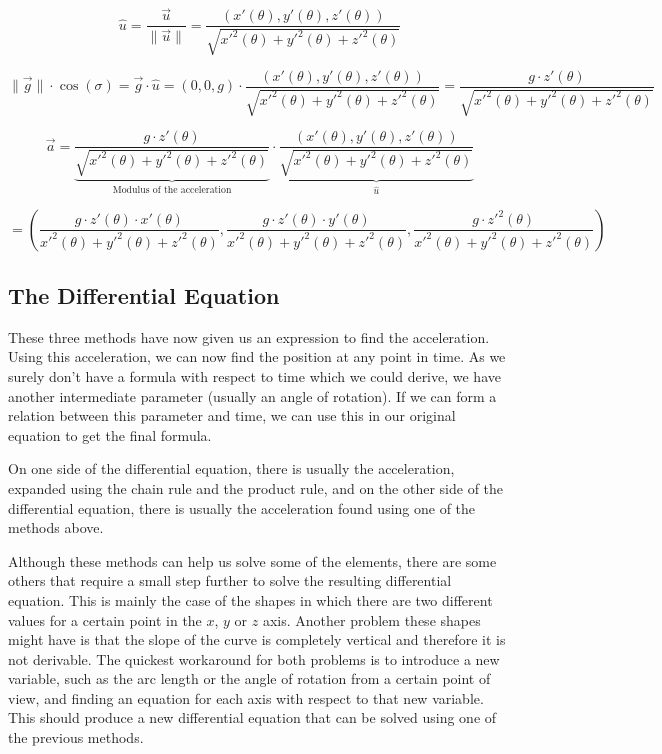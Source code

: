 \documentclass[12pt,twoside,a4paper]{article}
\begin{document}
	$$\hat{u} = \frac{\vec{u}}{\|\vec{u}\|} = \frac{(x'(\theta), y'(\theta), z'(\theta))}{\sqrt{x'^2(\theta) + y'^2(\theta) + z'^2(\theta)}}$$
	
	$$\|\vec{g}\| \cdot \cos(\sigma) = \vec{g} \cdot \hat{u} = (0, 0, g) \cdot \frac{(x'(\theta), y'(\theta), z'(\theta))}{\sqrt{x'^2(\theta) + y'^2(\theta) + z'^2(\theta)}} = \frac{g \cdot z'(\theta)}{\sqrt{x'^2(\theta) + y'^2(\theta) + z'^2(\theta)}}$$
	
	$$\vec{a} = \underset{\text{Modulus of the acceleration}}{\underbrace{\frac{g \cdot z'(\theta)}{\sqrt{x'^2(\theta) + y'^2(\theta) + z'^2(\theta)}}}} \cdot \underset{\hat{u}}{\underbrace{\frac{(x'(\theta), y'(\theta), z'(\theta))}{\sqrt{x'^2(\theta) + y'^2(\theta) + z'^2(\theta)}}}}$$
	
	$$= \left(\frac{g \cdot z'(\theta) \cdot x'(\theta)}{x'^2(\theta) + y'^2(\theta) + z'^2(\theta)}, \frac{g \cdot z'(\theta) \cdot y'(\theta)}{x'^2(\theta) + y'^2(\theta) + z'^2(\theta)}, \frac{g \cdot z'^2(\theta)}{x'^2(\theta) + y'^2(\theta) + z'^2(\theta)}\right)$$
	
	\newpage
	
	\subsection{The Differential Equation}
	These three methods have now given us an expression to find the acceleration. Using this acceleration, we can now find the position at any point in time. As we surely don't have a formula with respect to time which we could derive, we have another intermediate parameter (usually an angle of rotation). If we can form a relation between this parameter and time, we can use this in our original equation to get the final formula.
	
	On one side of the differential equation, there is usually the acceleration, expanded using the chain rule and the product rule, and on the other side of the differential equation, there is usually the acceleration found using one of the methods above.
	
	Although these methods can help us solve some of the elements, there are some others that require a small step further to solve the resulting differential equation. This is mainly the case of the shapes in which there are two different values for a certain point in the $x$, $y$ or $z$ axis. Another problem these shapes might have is that the slope of the curve is completely vertical and therefore it is not derivable. The quickest workaround for both problems is to introduce a new variable, such as the arc length or the angle of rotation from a certain point of view, and finding an equation for each axis with respect to that new variable. This should produce a new differential equation that can be solved using one of the previous methods.
	
\end{document}
